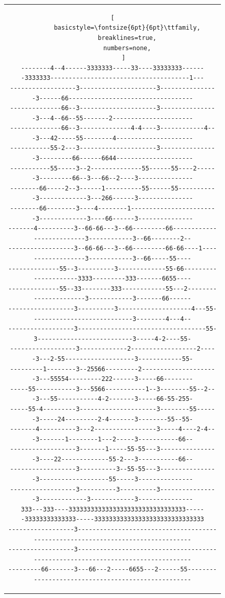 \documentclass[12pt,a4paper]{article}
\begin{document}
\begin{figure}[H]
\begin{tabular}{c}
\begin{lstlisting}[
        basicstyle=\fontsize{6pt}{6pt}\ttfamily,
        breaklines=true,
        numbers=none,
      ]
--------4--4------3333333-----33----33333333-------3333333--------------------------------------1---
------------------3---------------------3----------------3------66----------------------------------
--------------66--3---------------------3----------------3---4--66--55-------2----------------------
--------------66--3--------------4-4----3------------4---3---42-----55--------4---------------------
-----------55-2---3---------------------3----------------3---------66------6644---------------------
-----------55-----3--2--------------55------55----2------3---------66--3---66--2----3---------------
--------66-----2--3------1----------55------55-----------3-------------3---266------3---------------
--------66--------3----4--------1------------------------3-------------3----66------3---------------
-------4----------3--66-66---3--66---------66--------------------------3------------3--66--------2--
------------------3--66-66---3--66---------66-66----1------------------3------------3--66-----55----
--------------55--3----------3-------------55-66---------------------3333---------333-------6655----
--------------55--33--------333------------55---2----------------------3------------3-------66------
------------------3----------3--------------------4---55----------------------------3--------4---4--
------------------3-----------------------------------55-3--------------------------3-----4-2----55-
------------------3-------------2------------------2-----3---2-55-------------------3------------55-
---------1--------3--25566---------2---------------------3---55554---------222------3-----66--------
-----55-----------3---5566-----------1--3--------55--2---3---55-----------4-2-------3-----66-55-255-
-----55-4---------3---------------------3--------55------3-----24---------2-4-------3--------55--55-
-------4----------3---2-----------------3-----4----2-4---3-------1--------1---2-----3-----------66--
------------------3-------1-----55-55---3----------------3----22-------------55-2---3-----------66--
------------------3----------3--55-55---3----------------3-------------------55-----3---------------
------------------3----------3----------3----------------3-------------3------------3---------------
333---333----33333333333333333333333333333333------33333333333333-----333333333333333333333333333333
------------------3---------------------------------------------------------------------------------
------------------3---------------------------------------------------------------------------------
---------66-------3---66---2-----6655---2------55---------------------------------------------------

\end{lstlisting}
\end{tabular}
\end{figure}
\end{document}
